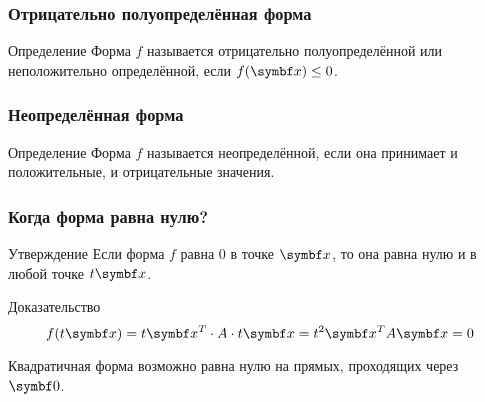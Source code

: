 \begin{frame}
\frametitle{Отрицательно полуопределённая форма}

\begin{block}{Определение}
    Форма $f$ называется \alert{отрицательно полуопределённой} или
    \alert{неположительно определённой}, если $f(\bx) \leq 0$.
\end{block}

    \pause

\begin{center}
\end{center}
    
\end{frame}



\begin{frame}
    \frametitle{Неопределённая форма}

    \begin{block}{Определение}
        Форма $f$ называется \alert{неопределённой}, если она принимает и положительные, и отрицательные значения.
    \end{block}

    \pause

\begin{center}
\end{center}
    
\end{frame}



\begin{frame}
    \frametitle{Когда форма равна нулю?}

    \begin{block}{Утверждение}
        Если форма $f$ равна $0$ в точке $\bx$, то она равна нулю и
        в любой точке $t\bx$. 
    \end{block}
    \pause
    \begin{block}{Доказательство}
        \[
        f(t\bx) = t\bx^T \cdot A \cdot t\bx = t^2 \bx^T A \bx = 0
        \]
    \end{block}
    \pause
    Квадратичная форма возможно равна нулю на прямых, проходящих через $\bzero$.
    
\end{frame}